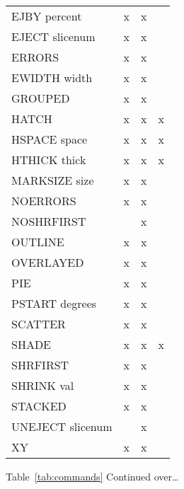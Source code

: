 \begin{center}
\begin{tabular}{lccc}
EJBY  percent                    &     x     &     x  &                    \\
EJECT  slicenum                  &     x     &     x  &                    \\
ERRORS                           &     x     &     x  &                    \\
EWIDTH  width                    &     x     &     x  &                    \\
GROUPED                          &     x     &     x  &                    \\
HATCH                            &     x     &     x  &       x            \\
HSPACE  space                    &     x     &     x  &       x            \\
HTHICK  thick                    &     x     &     x  &       x            \\
MARKSIZE  size                   &     x     &     x  &                    \\
NOERRORS                         &     x     &     x  &                    \\
NOSHRFIRST                       &           &     x  &                    \\
OUTLINE                          &     x     &     x  &                    \\
OVERLAYED                        &     x     &     x  &                    \\
PIE                              &     x     &     x  &                    \\
PSTART  degrees                  &     x     &     x  &                    \\
SCATTER                          &     x     &     x  &                    \\
SHADE                            &     x     &     x  &       x            \\
SHRFIRST                         &     x     &     x  &                    \\
SHRINK  val                      &     x     &     x  &                    \\
STACKED                          &     x     &     x  &                    \\
UNEJECT  slicenum                &           &     x  &                    \\
XY                               &     x     &     x  &                    \\ \hline
\end{tabular}
\normalsize
\end{center}
Table~\ref{tab:commands} Continued over\ldots

